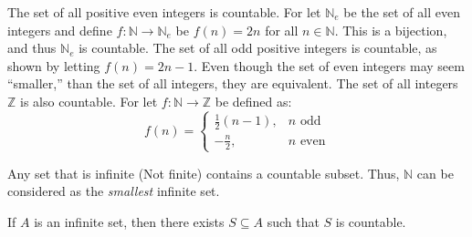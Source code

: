         \begin{example}
            The set of all positive even integers is
            countable. For let $\mathbb{N}_{e}$ be the
            set of all even integers and define
            $f:\mathbb{N}\rightarrow\mathbb{N}_{e}$ be
            $f(n)=2n$ for all $n\in\mathbb{N}$. This is
            a bijection, and thus $\mathbb{N}_{e}$ is
            countable. The set of all odd positive integers
            is countable, as shown by letting
            $f(n)=2n-1$. Even though the set of even
            integers may seem ``smaller,'' than the set of
            all integers, they are equivalent. The set of
            all integers $\mathbb{Z}$ is also countable.
            For let $f:\mathbb{N}\rightarrow\mathbb{Z}$
            be defined as:
            \begin{equation}
                f(n)=
                \begin{cases}
                    \frac{1}{2}(n-1),&n\textrm{ odd}\\
                    -\frac{n}{2},&n\textrm{ even}
                \end{cases}
            \end{equation}
        \end{example}
        Any set that is infinite (Not finite) contains a
        countable subset. Thus, $\mathbb{N}$ can be
        considered as the \textit{smallest} infinite set.
        \begin{theorem}
            If $A$ is an infinite set, then there exists
            $S\subseteq{A}$ such that $S$ is countable.
        \end{theorem}
